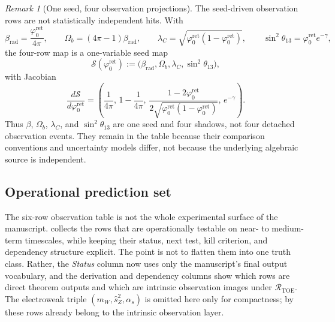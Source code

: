 \documentclass[11pt,a4paper]{article}
\theoremstyle{definition}
\theoremstyle{remark}
\newtheorem*{remark}{Remark}
\newcommand{\phiz}{\varphi_0^{\mathrm{ret}}}
\begin{document}
\begin{remark}[One seed, four observation projections]
The seed-driven observation rows are not statistically independent hits. With
\[
\beta_{\mathrm{rad}}=\frac{\phiz}{4\pi},
\qquad
\Omega_b=(4\pi-1)\beta_{\mathrm{rad}},
\qquad
\lambda_C=\sqrt{\phiz(1-\phiz)},
\qquad
\sin^2\theta_{13}=\phiz e^{-\gamma},
\]
the four-row map is a one-variable seed map
\[
\mathcal S(\phiz):=\bigl(\beta_{\mathrm{rad}},\Omega_b,\lambda_C,\sin^2\theta_{13}\bigr),
\]
with Jacobian
\[
\frac{d\mathcal S}{d\phiz}
=
\left(
\frac{1}{4\pi},
\,
1-\frac{1}{4\pi},
\,
\frac{1-2\phiz}{2\sqrt{\phiz(1-\phiz)}},
\,
e^{-\gamma}
\right).
\]
Thus $\beta$, $\Omega_b$, $\lambda_C$, and $\sin^2\theta_{13}$ are one seed and four shadows,
not four detached observation events. They remain in the table because their comparison
conventions and uncertainty models differ, not because the underlying algebraic source is
independent.
\end{remark}

\subsection{Operational prediction set}

The six-row observation table is not the whole experimental surface of the manuscript.
 collects the rows that are operationally testable on near-
to medium-term timescales, while keeping their status, next test, kill criterion, and dependency
structure explicit. The point is not to flatten them into one truth class. Rather, the
\emph{Status} column now uses only the manuscript's final output vocabulary, and the derivation
and dependency columns show which rows are direct theorem outputs and which are intrinsic
observation images under $\mathcal R_{\mathrm{TOE}}$. The electroweak triple
$(m_W,\hat s_Z^2,\alpha_s)$ is omitted here only for compactness; by
 these rows already belong to the
intrinsic observation layer.
\end{document}
